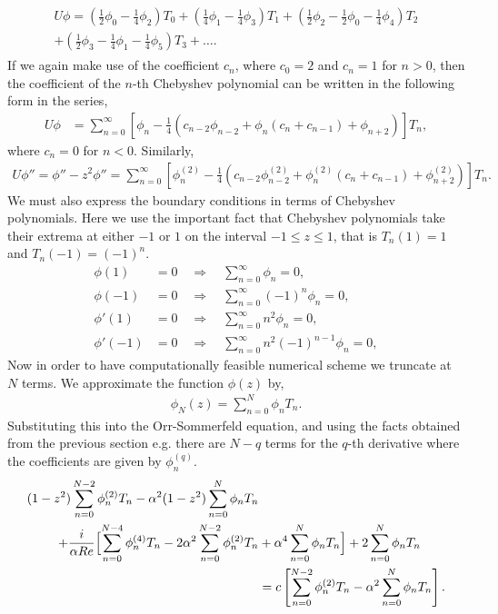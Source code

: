 \documentclass[a4paper, 12pt, twoside, openright]{article}
\numberwithin{equation}{section}
\begin{document}
\begin{align}
\begin{split} 
U\phi = \left(\frac{1}{2}\phi_0 - \frac{1}{4}\phi_2\right)T_0 + \left(\frac{1}{4}\phi_1 - \frac{1}{4}\phi_3\right)T_1 + \left(\frac{1}{2}\phi_2 - \frac{1}{2}\phi_0 - \frac{1}{4}\phi_4\right)T_2 \\ + \left(\frac{1}{2}\phi_3 -\frac{1}{4}\phi_1 - \frac{1}{4}\phi_5 \right)T_3 + \dots.
\end{split}
\end{align}
If we again make use of the coefficient $c_n$, where $c_0=2$ and $c_n=1$ for $n>0$, then the coefficient of the $n$-th Chebyshev polynomial can be written in the following form in the series,  
\begin{align}
U\phi &= \sum_{n=0}^{\infty} \left[\phi_n - \frac{1}{4}\left(c_{n-2}\phi_{n-2}+\phi_n\left(c_n + c_{n-1}\right) +\phi_{n+2}\right) \right]T_n,\label{eq:Uphi}
\end{align}
where $c_n=0$ for $n<0$. Similarly, 
\begin{align}
U\phi'' = \phi'' - z^2 \phi'' = \sum_{n=0}^{\infty} \left[\phi_n^{(2)} - \frac{1}{4}\left(c_{n-2}\phi_{n-2}^{(2)}+\phi_n^{(2)}\left(c_n + c_{n-1}\right) +\phi_{n+2}^{(2)}\right) \right]T_n.\label{eq:Uphi''}
\end{align}
We must also express the boundary conditions in terms of Chebyshev polynomials. Here we use the important fact that Chebyshev polynomials take their extrema at either $-1$ or $1$ on the interval $-1\leq z\leq 1$, that is $T_n(1)=1$ and $T_n(-1)=(-1)^{n}$.
\begin{align}
\phi(1) &= 0 \quad \Rightarrow \quad \sum_{n=0}^{\infty}\phi_n = 0, \\
\phi(-1) &= 0 \quad \Rightarrow \quad \sum_{n=0}^{\infty}(-1)^n\phi_n = 0, \\
\phi'(1) &= 0 \quad \Rightarrow \quad \sum_{n=0}^{\infty}n^2\phi_n = 0,  \\
\phi'(-1) &= 0 \quad \Rightarrow \quad \sum_{n=0}^{\infty}n^2(-1)^{n-1}\phi_n = 0,
\end{align}
Now in order to have computationally feasible numerical scheme we truncate at $N$ terms. We approximate the function $\phi(z)$ by,
\begin{align}
\phi_N(z) = \sum_{n=0}^{N}\phi_nT_n.
\end{align}
Substituting this into the Orr-Sommerfeld equation, and using the facts obtained from the previous section e.g. there are $N-q$ terms for the $q$-th derivative where the coefficients are given by $\phi_n^{(q)}$. \begin{align}
\begin{split}
(1-z^2)\sum_{n=0}^{N-2}\phi_n^{(2)} T_n - \alpha^2(1-z^2)\sum_{n=0}^{N}\phi_n T_n& \\+ \frac{i}{\alpha Re}\Bigl[\sum_{n=0}^{N-4}\phi_n^{(4)} T_n - 2\alpha^2\sum_{n=0}^{N-2}\phi_n^{(2)} T_n &+ \alpha^4\sum_{n=0}^{N}\phi_n T_n \Bigr] + 2\sum_{n=0}^{N}\phi_n T_n\\ &= c\left[\sum_{n=0}^{N-2}\phi_n^{(2)} T_n - \alpha^2\sum_{n=0}^{N}\phi_n T_n \right]. \\ 
\end{split}
\end{align}
\end{document}
